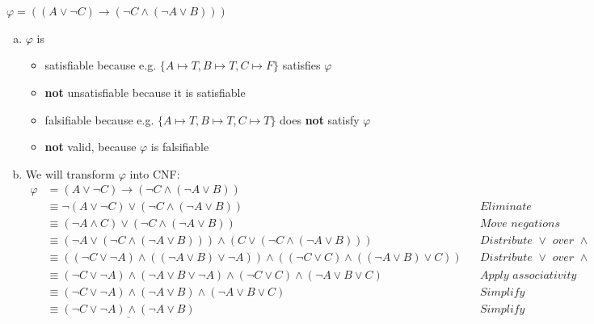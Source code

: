 \documentclass{article} %
\begin{document}
\section{}
$\varphi = ((A \lor \lnot C) \rightarrow (\lnot C \land (\lnot A \lor B)))$
\begin{enumerate}[(a)]
    \item $\varphi$ is
    \begin{itemize}
        \item satisfiable because e.g. $\{
            A \mapsto T,
            B \mapsto T,
            C \mapsto F
        \}$ satisfies $\varphi$
        \item \textbf{not} unsatisfiable because it is satisfiable
        \item falsifiable because e.g. $\{
            A \mapsto T,
            B \mapsto T,
            C \mapsto T
        \}$ does \textbf{not} satisfy $\varphi$
        \item \textbf{not} valid, because $\varphi$ is falsifiable
    \end{itemize}
    \item We will transform $\varphi$ into CNF:\\[-1.8em]
    \begin{align}
        \nonumber
        \varphi &= (A \lor \lnot C) \rightarrow (\lnot C \land (\lnot A \lor B))\\
        \nonumber
        &\equiv \lnot (A \lor \lnot C) \lor (\lnot C \land (\lnot A \lor B))
        && \textit{Eliminate implications}\\
        \nonumber
        &\equiv (\lnot A \land C) \lor (\lnot C \land (\lnot A \lor B))
        && \textit{Move negations inside}\\
        \nonumber
        &\equiv (\lnot A \lor (\lnot C \land (\lnot A \lor B))) \land (C \lor (\lnot C \land (\lnot A \lor B)))
        && \textit{Distribute $\lor$ over $\land$}\\
        \nonumber
        &\equiv ((\lnot C \lor \lnot A) \land ((\lnot A \lor B) \lor \lnot A)) \land
        ((\lnot C \lor C) \land ((\lnot A \lor B) \lor C))
        && \textit{Distribute $\lor$ over $\land$}\\
        \nonumber
        &\equiv (\lnot C \lor \lnot A) \land (\lnot A \lor B \lor \lnot A) \land
        (\lnot C \lor C) \land (\lnot A \lor B \lor C)
        && \textit{Apply associativity}\\
        \nonumber
        &\equiv (\lnot C \lor \lnot A) \land (\lnot A \lor B) \land
        (\lnot A \lor B \lor C)
        && \textit{Simplify}\\
        \nonumber
        &\equiv \underline{(\lnot C \lor \lnot A) \land (\lnot A \lor B)}
        && \textit{Simplify}
        \nonumber
    \end{align}
\end{enumerate}
\end{document}
